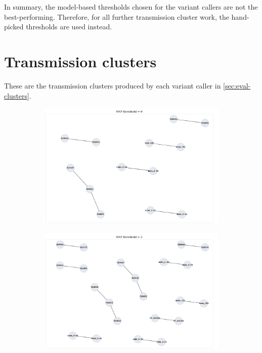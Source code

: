 \vspace{\baselineskip}
\noindent
In summary, the model-based thresholds chosen for the \ont{} variant callers are not the best-performing. Therefore, for all further transmission cluster work, the hand-picked thresholds are used instead.


\section{Transmission clusters}

These are the transmission clusters produced by each variant caller in \autoref{sec:eval-clusters}.

\begin{figure}
     \centering
     \begin{subfigure}[b]{0.45\textwidth}
         \centering
         \includegraphics[width=\textwidth]{Appendix1/Figs/compass_clusters_t0.png}
         \caption{}
     \end{subfigure}
     \hfill
     \begin{subfigure}[b]{0.45\textwidth}
         \centering
         \includegraphics[width=\textwidth]{Appendix1/Figs/compass_clusters_t2.png}

\end{subfigure}
\end{figure}
